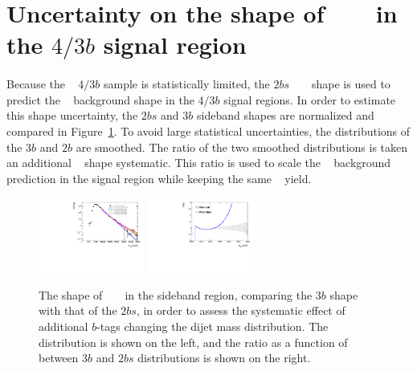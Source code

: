 \section{Uncertainty on the shape of \ttbar~ \mtwoJ~ in the $4/3b$ signal region}
\label{sec:unc-shape-ttbar-in-sr}

\paragraph{}
Because the \ttbar~ $4/3b$ sample is statistically limited, the $2bs$ \ttbar~ \mtwoJ~ shape is used to predict the \ttbar~ background shape in the $4/3b$ signal regions.
In order to estimate this shape uncertainty, the $2bs$ and $3b$ sideband shapes are normalized and compared in Figure~\ref{fig:ttbar-shapes-signal}.  
To avoid large statistical uncertainties, the distributions of the $3b$ and $2b$ are smoothed. 
The ratio of the two smoothed distributions is taken an additional \ttbar~ shape systematic. 
This ratio is used to scale the \ttbar~ background prediction in the signal region while keeping the same \ttbar~ yield.

\begin{figure}[htb!]
\begin{center} 
\includegraphics[width=0.31\textwidth,angle=-90]{figures/boosted/Syst_Smooth/TopShapeSRSysfitSmooth_sig33_comp22.pdf}
\includegraphics[width=0.31\textwidth,angle=-90]{figures/boosted/Syst_Smooth/TopShapeSRSysfitSmooth_sig33_comp22_ratio.pdf}
\caption{The shape of \ttbar~ \mtwoJ~ in the sideband region,
comparing the $3b$ shape with that of the $2bs$, in order to assess the systematic effect of additional $b$-tags changing the dijet mass distribution. The \mtwoJ~ distribution is shown on the left, and the ratio as a function of \mtwoJ~ between $3b$ and $2bs$ distributions is shown on the right.}
\label{fig:ttbar-shapes-signal}
\end{center}
\end{figure}

